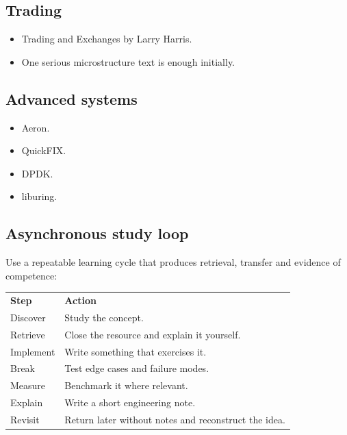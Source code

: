 \documentclass[11pt,letterpaper]{article}
\begin{document}
\subsection*{Trading}

\begin{itemize}

\item Trading and Exchanges by Larry Harris.

\item One serious microstructure text is enough initially.

\end{itemize}

\subsection*{Advanced systems}

\begin{itemize}

\item Aeron.

\item QuickFIX.

\item DPDK.

\item liburing.

\end{itemize}

\par{}
\begin{samepage}
\section{Asynchronous study loop}\label{sec:19}

Use a repeatable learning cycle that produces retrieval, transfer and evidence of competence:

\begin{center}
\small
\begin{tabular}{>{\raggedright\arraybackslash}p{}>{\raggedright\arraybackslash}p{}}
\textbf{Step} & \textbf{Action} \\
Discover & Study the concept. \\
Retrieve & Close the resource and explain it yourself. \\
Implement & Write something that exercises it. \\
Break & Test edge cases and failure modes. \\
Measure & Benchmark it where relevant. \\
Explain & Write a short engineering note. \\
Revisit & Return later without notes and reconstruct the idea. \\
\end{tabular}
\end{center}

\end{samepage}
\end{document}
